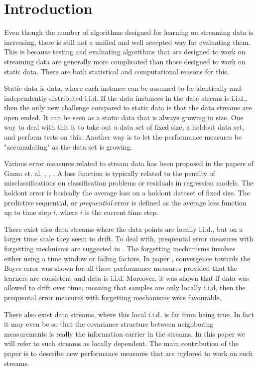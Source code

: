 \section{Introduction}

Even though the number of algorithms designed for learning on streaming data is increasing, there is still not a unified and well accepted way for evaluating them.  This is because testing and evaluating algorithms that are designed to work on streaming data are generally more complicated than those designed to work on static data.  There are both statistical and computational reasons for this.  

Static data is data, where each instance can be assumed to be identically and independently distributed i.i.d. 
If the data instances in the data stream is i.i.d., then the only new challenge compared to static data is that the data streams are open ended.  It can be seen as a static data that is always growing in size.  One way to deal with this is to take out a data set of fixed size, a holdout data set, and perform tests on this.  Another way is to let the performance measures be "accumulating" as the data set is growing.  

Various error measures related to stream data has been proposed in the papers of Gama et. al. \cite{Gam09}, \cite{Gam09_2}, \cite{Gam12}.  A loss function is typically related to the penalty of misclassifications on classification problems or residuals in regression models.  The holdout error is basically the average loss on a holdout dataset of fixed size.  The predictive sequential, or \emph{prequential} error is defined as the average loss function up to time step $i$, where $i$ is the current time step. 

There exist also data streams where the data points are locally i.i.d., but on a larger time scale they seem to drift.  To deal with, prequental error measures with forgetting mechnisms are suggested in \cite{Gam12}. The forgetting mechanisms involves either using a time window or fading factors.  In paper \cite{Gam12}, convergence towards the Bayes error was shown for all these performance measures provided that the learners are consistent and data is i.i.d.  Moreover, it was shown that if data was allowed to drift over time, meaning that samples are only locally i.i.d, then the prequental error measures with forgetting mechanisms were favourable.

There also exist data streams, where this local i.i.d. is far from being true.  In fact it may even be so that the covariance structure between neighboring measurements is really the information carrier in the streams.  In  this paper we will refer to such streams as locally dependent.  The main contribution of the paper is to describe new performance measures that are taylored to work on such streams.


